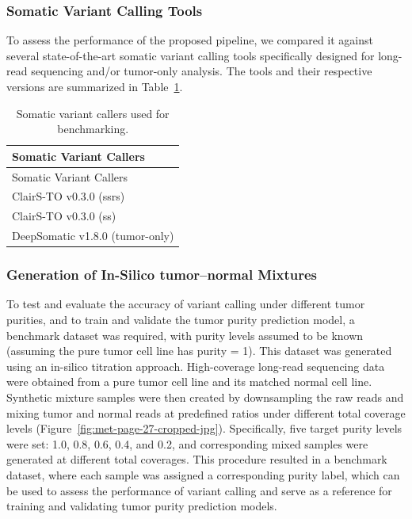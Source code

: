 \documentclass[pdflatex,sn-nature]{sn-jnl}
\begin{document}
\subsubsection{Somatic Variant Calling Tools}\label{somatic-variant-calling-tools}

To assess the performance of the proposed pipeline, we compared it against several state-of-the-art somatic variant calling tools specifically designed for long-read sequencing and/or tumor-only analysis. The tools and their respective versions are summarized in Table~\ref{tab:callers}.

\begin{longtable}[]{@{}l@{}}
\caption{Somatic variant callers used for benchmarking.}
\label{tab:callers} \\
\toprule
Somatic Variant Callers \\
\midrule
\endfirsthead
\toprule
Somatic Variant Callers \\
\midrule
\endhead
\bottomrule
\endlastfoot
ClairS-TO v0.3.0 (ssrs) \\
ClairS-TO v0.3.0 (ss) \\
DeepSomatic v1.8.0 (tumor-only) \\
\end{longtable}

\subsubsection{Generation of In-Silico tumor–normal Mixtures}\label{generation-of-in-silico-tumor–normal-mixtures}

To test and evaluate the accuracy of variant calling under different tumor purities, and to train and validate the tumor purity prediction model, a benchmark dataset was required, with purity levels assumed to be known (assuming the pure tumor cell line has purity = 1). This dataset was generated using an in-silico titration approach. High-coverage long-read sequencing data were obtained from a pure tumor cell line and its matched normal cell line. Synthetic mixture samples were then created by downsampling the raw reads and mixing tumor and normal reads at predefined ratios under different total coverage levels (Figure~\ref{fig:met-page-27-cropped-jpg}). Specifically, five target purity levels were set: 1.0, 0.8, 0.6, 0.4, and 0.2, and corresponding mixed samples were generated at different total coverages. This procedure resulted in a benchmark dataset, where each sample was assigned a corresponding purity label, which can be used to assess the performance of variant calling and serve as a reference for training and validating tumor purity prediction models.
\end{document}
